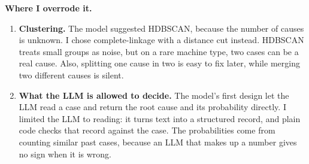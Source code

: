 \documentclass[11pt,a4paper]{article}
\begin{document}
\textbf{Where I overrode it.}
\begin{enumerate}
  \item \textbf{Clustering.} The model suggested HDBSCAN, because the number of causes is unknown. I chose complete-linkage with a distance cut instead. HDBSCAN treats small groups as noise, but on a rare machine type, two cases can be a real cause. Also, splitting one cause in two is easy to fix later, while merging two different causes is silent.
  \item \textbf{What the LLM is allowed to decide.} The model's first design let the LLM read a case and return the root cause and its probability directly. I limited the LLM to reading: it turns text into a structured record, and plain code checks that record against the case. The probabilities come from counting similar past cases, because an LLM that makes up a number gives no sign when it is wrong.
\end{enumerate}
\end{document}
